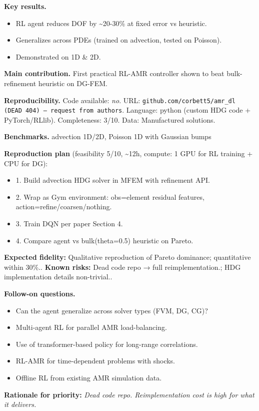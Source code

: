 \documentclass[10pt,letterpaper]{article}
\begin{document}
\textbf{Key results.}
\begin{itemize}
\item RL agent reduces DOF by \~{}20-30\% at fixed error vs heuristic.
\item Generalizes across PDEs (trained on advection, tested on Poisson).
\item Demonstrated on 1D \& 2D.
\end{itemize}

\textbf{Main contribution.} First practical RL-AMR controller shown to beat bulk-refinement heuristic on DG-FEM.

\textbf{Reproducibility.} Code available: \emph{no}. URL: \texttt{github.com/corbett5/amr\_dl (DEAD 404) — request from authors}. Language: python (custom HDG code + PyTorch/RLlib). Completeness: 3/10. Data: Manufactured solutions.

\textbf{Benchmarks.} advection 1D/2D, Poisson 1D with Gaussian bumps

\textbf{Reproduction plan} (feasibility 5/10, \textasciitilde12h, compute: 1 GPU for RL training + CPU for DG):
\begin{itemize}
\item 1. Build advection HDG solver in MFEM with refinement API.
\item 2. Wrap as Gym environment: obs=element residual features, action=refine/coarsen/nothing.
\item 3. Train DQN per paper Section 4.
\item 4. Compare agent vs bulk(theta=0.5) heuristic on Pareto.
\end{itemize}
\textbf{Expected fidelity:} Qualitative reproduction of Pareto dominance; quantitative within 30\%.. \textbf{Known risks:} Dead code repo → full reimplementation.; HDG implementation details non-trivial..

\textbf{Follow-on questions.}
\begin{itemize}
\item Can the agent generalize across solver types (FVM, DG, CG)?
\item Multi-agent RL for parallel AMR load-balancing.
\item Use of transformer-based policy for long-range correlations.
\item RL-AMR for time-dependent problems with shocks.
\item Offline RL from existing AMR simulation data.
\end{itemize}

\textbf{Rationale for priority:} \emph{Dead code repo. Reimplementation cost is high for what it delivers.}
\end{document}
